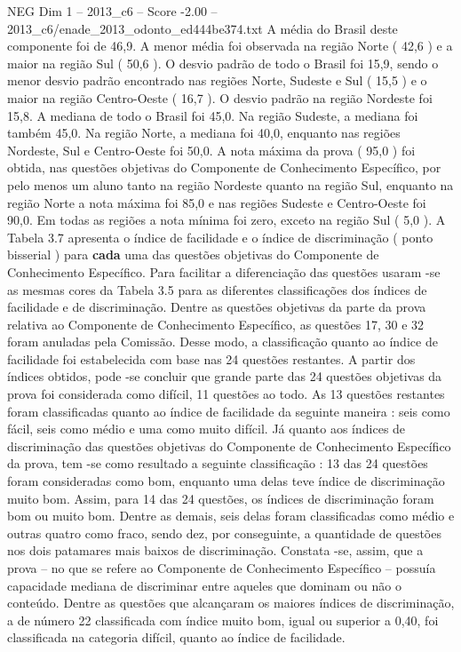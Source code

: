 \begin{textsample}{NEG Dim 1 – 2013\_c6 – Score -2.00 – 2013\_c6/enade\_2013\_odonto\_ed444be374.txt}
A média do Brasil deste componente foi de 46,9.
A menor média foi observada na região Norte ( 42,6 ) e a maior na região Sul ( 50,6 ).
O desvio padrão de todo o Brasil foi 15,9, sendo o menor desvio padrão encontrado nas regiões Norte, Sudeste e Sul ( 15,5 ) e o maior na região Centro-Oeste ( 16,7 ).
O desvio padrão na região Nordeste foi 15,8.
A mediana de todo o Brasil foi 45,0.
Na região Sudeste, a mediana foi também 45,0.
Na região Norte, a mediana foi 40,0, enquanto nas regiões Nordeste, Sul e Centro-Oeste foi 50,0.
A nota máxima da prova ( 95,0 ) foi obtida, nas questões objetivas do Componente de Conhecimento Específico, por pelo menos um aluno tanto na região Nordeste quanto na região Sul, enquanto na região Norte a nota máxima foi 85,0 e nas regiões Sudeste e Centro-Oeste foi 90,0.
Em todas as regiões a nota mínima foi zero, exceto na região Sul ( 5,0 ).
A Tabela 3.7 apresenta o índice de facilidade e o índice de discriminação ( ponto bisserial ) para \textbf{cada} uma das questões objetivas do Componente de Conhecimento Específico.
Para facilitar a diferenciação das questões usaram -se as mesmas cores da Tabela 3.5 para as diferentes classificações dos índices de facilidade e de discriminação.
Dentre as questões objetivas da parte da prova relativa ao Componente de Conhecimento Específico, as questões 17, 30 e 32 foram anuladas pela Comissão.
Desse modo, a classificação quanto ao índice de facilidade foi estabelecida com base nas 24 questões restantes.
A partir dos índices obtidos, pode -se concluir que grande parte das 24 questões objetivas da prova foi considerada como difícil, 11 questões ao todo.
As 13 questões restantes foram classificadas quanto ao índice de facilidade da seguinte maneira : seis como fácil, seis como médio e uma como muito difícil.
Já quanto aos índices de discriminação das questões objetivas do Componente de Conhecimento Específico da prova, tem -se como resultado a seguinte classificação : 13 das 24 questões foram consideradas como bom, enquanto uma delas teve índice de discriminação muito bom.
Assim, para 14 das 24 questões, os índices de discriminação foram bom ou muito bom.
Dentre as demais, seis delas foram classificadas como médio e outras quatro como fraco, sendo dez, por conseguinte, a quantidade de questões nos dois patamares mais baixos de discriminação.
Constata -se, assim, que a prova – no que se refere ao Componente de Conhecimento Específico – possuía capacidade mediana de discriminar entre aqueles que dominam ou não o conteúdo.
Dentre as questões que alcançaram os maiores índices de discriminação, a de número 22 classificada com índice muito bom, igual ou superior a 0,40, foi classificada na categoria difícil, quanto ao índice de facilidade.

\end{textsample}
